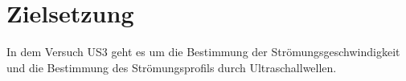 \section{Zielsetzung} 

\begin{flushleft}
    In dem Versuch US3 geht es um die Bestimmung der Strömungsgeschwindigkeit und die Bestimmung des Strömungsprofils durch Ultraschallwellen.
\end{flushleft}